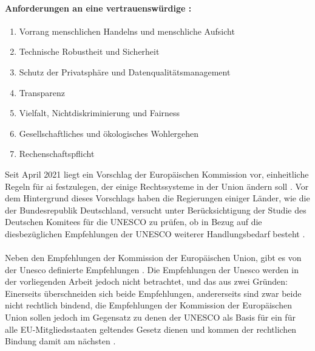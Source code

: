 \documentclass[hidelinks,12pt]{report}
\begin{document}
\paragraph{Anforderungen an eine vertrauenswürdige :}
\begin{samepage}
	\begin{enumerate}
		\item  Vorrang menschlichen Handelns und menschliche Aufsicht
		\item  Technische Robustheit und Sicherheit
		\item  Schutz der Privatsphäre und Datenqualitätsmanagement
		\item  Transparenz
		\item  Vielfalt, Nichtdiskriminierung und Fairness
		\item  Gesellschaftliches und ökologisches Wohlergehen
		\item  Rechenschaftspflicht
	\end{enumerate}
\end{samepage}
Seit April 2021 liegt ein Vorschlag der Europäischen Kommission vor, einheitliche Regeln für \gls{ai} festzulegen, der einige Rechtssysteme in der Union ändern soll \cite{GesetzesentwurfEUComm}. Vor dem Hintergrund dieses Vorschlags haben die Regierungen einiger Länder, wie die der Bundesrepublik Deutschland, versucht unter Berücksichtigung der Studie des Deutschen Komitees für die UNESCO \cite{Kettemann} zu prüfen, ob in Bezug auf die diesbezüglichen Empfehlungen der UNESCO weiterer Handlungsbedarf besteht \cite{Deutscher_Bundestag}.  
\\\\
Neben den Empfehlungen der Kommission der Europäischen Union, gibt es von der Unesco definierte Empfehlungen \cite{UNESCO}. Die Empfehlungen der Unesco werden in der vorliegenden Arbeit jedoch nicht betrachtet, und das aus zwei Gründen: Einerseits überschneiden sich beide Empfehlungen, andererseits sind zwar beide nicht rechtlich bindend, die Empfehlungen der Kommission der Europäischen Union sollen jedoch im Gegensatz zu denen der UNESCO als Basis für ein für alle EU-Mitgliedsstaaten geltendes Gesetz dienen und kommen der rechtlichen Bindung damit am nächsten \cite{european_approach}.
\end{document}

